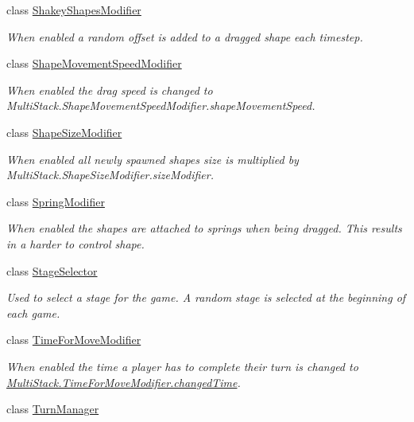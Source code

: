 \begin{DoxyCompactItemize}
class \hyperlink{class_multi_stack_1_1_shakey_shapes_modifier}{Shakey\+Shapes\+Modifier}
\begin{DoxyCompactList}\small\item\em When enabled a random offset is added to a dragged shape each timestep. \end{DoxyCompactList}\item 
class \hyperlink{class_multi_stack_1_1_shape_movement_speed_modifier}{Shape\+Movement\+Speed\+Modifier}
\begin{DoxyCompactList}\small\item\em When enabled the drag speed is changed to Multi\+Stack.\+Shape\+Movement\+Speed\+Modifier.\+shape\+Movement\+Speed. \end{DoxyCompactList}\item 
class \hyperlink{class_multi_stack_1_1_shape_size_modifier}{Shape\+Size\+Modifier}
\begin{DoxyCompactList}\small\item\em When enabled all newly spawned shapes size is multiplied by Multi\+Stack.\+Shape\+Size\+Modifier.\+size\+Modifier. \end{DoxyCompactList}\item 
class \hyperlink{class_multi_stack_1_1_spring_modifier}{Spring\+Modifier}
\begin{DoxyCompactList}\small\item\em When enabled the shapes are attached to springs when being dragged. This results in a harder to control shape. \end{DoxyCompactList}\item 
class \hyperlink{class_multi_stack_1_1_stage_selector}{Stage\+Selector}
\begin{DoxyCompactList}\small\item\em Used to select a stage for the game. A random stage is selected at the beginning of each game. \end{DoxyCompactList}\item 
class \hyperlink{class_multi_stack_1_1_time_for_move_modifier}{Time\+For\+Move\+Modifier}
\begin{DoxyCompactList}\small\item\em When enabled the time a player has to complete their turn is changed to \hyperlink{class_multi_stack_1_1_time_for_move_modifier_af70ee289af6f74c5ef18ef495fbc5c03}{Multi\+Stack.\+Time\+For\+Move\+Modifier.\+changed\+Time}. \end{DoxyCompactList}\item 
class \hyperlink{class_multi_stack_1_1_turn_manager}{Turn\+Manager}

\end{DoxyCompactItemize}
